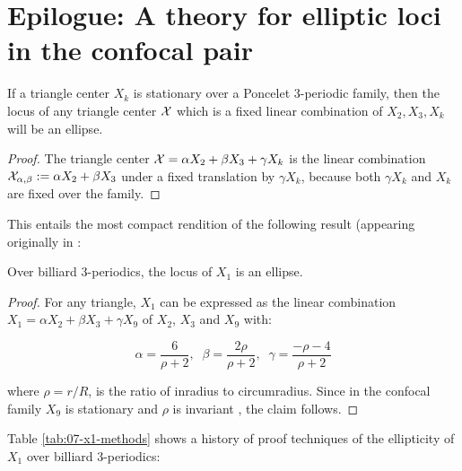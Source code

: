 \section{Epilogue: A theory for elliptic loci in the confocal pair}




\begin{proposition}
If a triangle center $X_k$ is stationary over a Poncelet 3-periodic family, then the locus of any triangle center $\mathcal{X}$ which is a fixed linear combination of $X_2,X_3,X_k$ will be an ellipse. 
\label{prop:07-fixed-lin-comb}
\end{proposition}

\begin{proof}
The triangle center $\mathcal{X}=\alpha X_2+ \beta X_3+ \gamma X_k$ is the linear combination $\mathcal{X}_{\alpha,\beta}:=\alpha X_2+ \beta X_3$ under a fixed translation by $\gamma X_k$, because both $\gamma X_k$ and $X_k$ are fixed over the family.
\end{proof}

This entails the most compact rendition of the following result (appearing originally in \cite{helman2021-theory}:

\begin{corollary}
Over billiard 3-periodics, the locus of $X_1$ is an ellipse.
\label{cor:07-x1-ellipse}
\end{corollary}

\begin{proof}
For any triangle, $X_1$ can be expressed as the linear combination $X_1=\alpha X_2+\beta X_3+\gamma X_9$ of $X_2$, $X_3$ and $X_9$ with:

\[ \alpha =\frac{6}{\rho+2},\;\;\beta=\frac{2\rho}{\rho+2},\;\;\gamma=\frac{-\rho-4}{\rho+2} \]

\noindent where $\rho=r/R$, is the ratio of inradius to circumradius. Since in the confocal family $X_9$ is stationary and $\rho$ is invariant \cite{reznik2020-intelligencer}, the claim follows.
\end{proof}

Table \cref{tab:07-x1-methods} shows a history of proof techniques of the ellipticity of $X_1$ over billiard 3-periodics:

